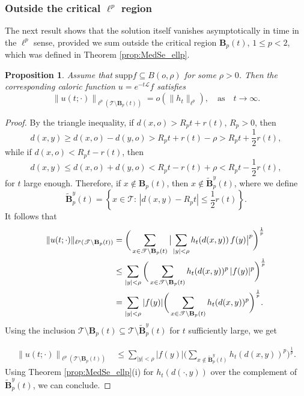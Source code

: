 \documentclass[11pt,a4paper,reqno]{amsart}
\renewcommand\mathcal{\mathscr}
\theoremstyle{plain}
\newtheorem{proposition}[theorem]{Proposition}
\theoremstyle{remark}
\theoremstyle{definition}
\theoremstyle{remark}
\numberwithin{equation}{section}
\newcommand\supp{\mathrm{supp}}
\begin{document}
	\subsubsection{Outside the critical $\ell^p$ region}\label{subsec:outside}
	The next result shows that the solution itself vanishes asymptotically in time in the $\ell^p$ sense, provided we sum outside the critical region $\textbf{B}_p(t)$, $1\leq p <2$, which was defined in Theorem \ref{prop:MedSe_ellp}. 
	\begin{proposition}\label{prop:outsideL1crit}
		Assume that $\supp f \subseteq B(o,\rho)$ for some $\rho>0$. Then the corresponding caloric function $u=e^{-t\mathcal{L}}f$ satisfies
		\[
\|u(t;\cdot)\|_{\ell^p(\mathcal{T}\setminus \textbf{B}_p(t))}=o(\|h_t\|_{\ell^p}), \quad \text{as}\quad t \to \infty.
		\]
	\end{proposition}
	\begin{proof}
		By the triangle inequality, if $d(x,o)>R_pt+r(t)$, $R_p>0$, then 
		\[d(x,y)\geq d(x,o)-d(y,o)>R_pt+r(t)-\rho>R_pt+\frac{1}{2}r(t),\]
		while if $d(x,o)<R_pt-r(t)$, then 
		\[ d(x,y)\leq d(x,o)+d(y,o)< R_pt-r(t)+\rho< R_pt-\frac{1}{2}r(t),
		\]
		for $t$ large enough.  Therefore, if $x\notin \textbf{B}_p(t)$, then $x\notin \widetilde{\textbf{B}}_{p}^{y}(t)$, where we define
		\begin{equation*}
		\widetilde{\textbf{B}}_{p}^{y}(t)=\left\{x\in \mathcal{T}:\, |d(x,y)-R_pt|\leq\frac{1}{2}r(t)\right\}.
		\end{equation*}
		It follows that \begin{align*}\|u(t;\cdot)\|_{\ell^p(\mathcal{T}\setminus \textbf{B}_p(t))}&=\bigg(\sum_{x\in \mathcal{T}\setminus \textbf{B}_p(t)} 
		\big| \sum_{|y|<\rho} h_t(d(x,y)) \, f(y) \big|^p \bigg)^{\frac{1}{p}} \notag\\
		&\leq 
		\sum_{|y|<\rho}
		\bigg( \sum_{x\in \mathcal{T}\setminus \textbf{B}_p(t)} h_t(d(x,y))^p\, |f(y)|^p \bigg)^{\frac{1}{p}} \notag\\
		&=
		\sum_{|y|<\rho}|f(y)|\bigg( \sum_{x\in \mathcal{T}\setminus \textbf{B}_p(t)} h_t(d(x,y))^p \bigg)^{\frac{1}{p}}.
	\end{align*}
	Using the inclusion $\mathcal{T}\setminus \textbf{B}_{p}(t)\subseteq \mathcal{T}\setminus\widetilde{\textbf{B}}_{p}^{y}(t)$ for $t$ sufficiently large, we get
        
    \begin{align*}
		\|u(t;\cdot)\|_{\ell^p(\mathcal{T}\setminus \textbf{B}_p(t))}
		&\leq
		\sum_{|y|<\rho}|f(y)|\bigg( \sum_{x\notin \widetilde{\textbf{B}}_{p}^{y}(t)} h_t(d(x,y))^p \bigg)^{\frac{1}{p}}.
		\end{align*}
		Using Theorem \ref{prop:MedSe_ellp}(i) for $h_t(d(\cdot, y))$ over the complement of $\widetilde{\textbf{B}}_{p}^{y}(t)$, we can conclude. 
	\end{proof}
	
\end{document}
